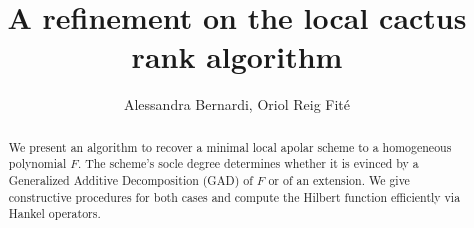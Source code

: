 \documentclass[a4paper,11p]{amsart}
\title{A refinement on the local cactus rank algorithm}
\author{Alessandra Bernardi, Oriol Reig Fité}
\begin{document}
\begin{abstract} We present an algorithm to  recover a minimal local apolar scheme to a homogeneous polynomial $F$.
The scheme’s socle degree determines whether it is evinced by a Generalized Additive Decomposition (GAD) of $F$ or of an extension.
We give constructive procedures for both cases and compute the Hilbert function efficiently via Hankel operators.
\end{abstract}
\maketitle
\end{document}

